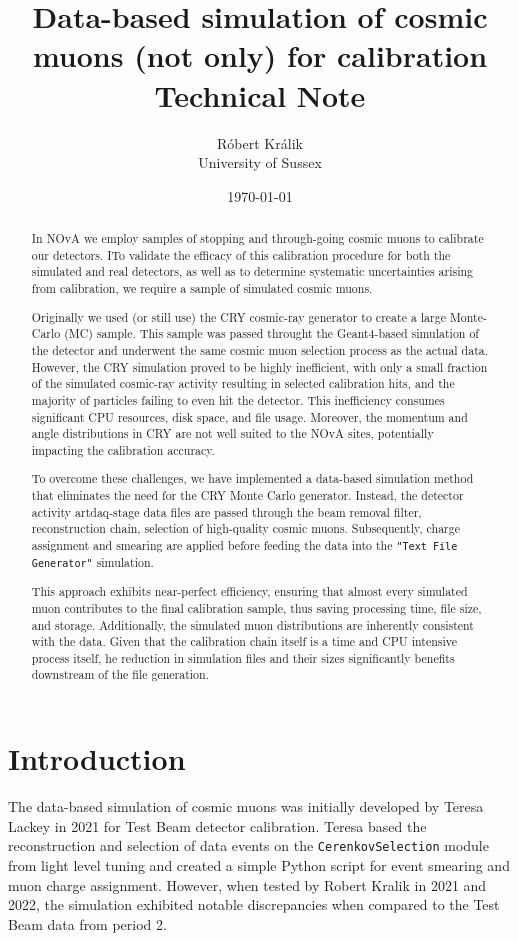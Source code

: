 \documentclass[12pt]{article}
\author{Róbert Králik\\\small{University of Sussex}}
\title{\textbf{Data-based simulation of cosmic muons (not only) for calibration\\ \vspace*{5mm}
\Large{Technical Note}}}
\date{\today}
\begin{document}
\maketitle
\begin{abstract}
In NOvA we employ samples of stopping and through-going cosmic muons to calibrate our detectors. ITo validate the efficacy of this calibration procedure for both the simulated and real detectors, as well as to determine systematic uncertainties arising from calibration, we require a sample of simulated cosmic muons.

Originally we used (or still use) the CRY cosmic-ray generator to create a large Monte-Carlo (MC) sample. This sample was passed throught the Geant4-based simulation of the detector and underwent the same cosmic muon selection process as the actual data. However, the CRY simulation proved to be highly inefficient, with only a small fraction of the simulated cosmic-ray activity resulting in selected calibration hits, and the majority of particles failing to even hit the detector. This inefficiency consumes significant CPU resources, disk space, and file usage. Moreover, the momentum and angle distributions in CRY are not well suited to the NOvA sites, potentially impacting the calibration accuracy.

To overcome these challenges, we have implemented a data-based simulation method that eliminates the need for the CRY Monte Carlo generator. Instead, the detector activity artdaq-stage data files are passed through the beam removal filter, reconstruction chain, selection of high-quality cosmic muons. Subsequently, charge assignment and smearing are applied before feeding the data into the \texttt{"Text File Generator"} simulation.

This approach exhibits near-perfect efficiency, ensuring that almost every simulated muon contributes to the final calibration sample, thus saving processing time, file size, and storage. Additionally, the simulated muon distributions are inherently consistent with the data. Given that the calibration chain itself is a time and CPU intensive process itself, he reduction in simulation files and their sizes significantly benefits downstream of the file generation.
\end{abstract}

\newpage
\tableofcontents

\section{Introduction}
The data-based simulation of cosmic muons was initially developed by Teresa Lackey in 2021 for Test Beam detector calibration. Teresa based the reconstruction and selection of data events on the \texttt{CerenkovSelection} module from light level tuning and created a simple Python script for event smearing and muon charge assignment. However, when tested by Robert Kralik in 2021 and 2022, the simulation exhibited notable discrepancies when compared to the Test Beam data from period 2.
\end{document}
